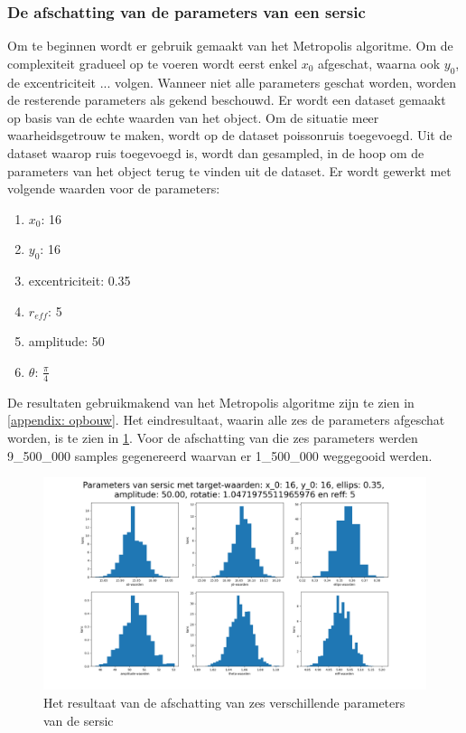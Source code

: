 \subsubsection{De afschatting van de parameters van een sersic}
Om te beginnen wordt er gebruik gemaakt van het Metropolis algoritme. Om de complexiteit gradueel op te voeren wordt eerst enkel $x_{0}$ afgeschat, waarna ook $y_{0}$, de excentriciteit ... volgen. Wanneer niet alle parameters geschat worden, worden de resterende parameters als gekend beschouwd. Er wordt een dataset gemaakt op basis van de echte waarden van het object. Om de situatie meer waarheidsgetrouw te maken, wordt op de dataset poissonruis toegevoegd. Uit de dataset waarop ruis toegevoegd is, wordt dan gesampled, in de hoop om de parameters van het object terug te vinden uit de dataset.
Er wordt gewerkt met volgende waarden voor de parameters:
\begin{enumerate}
    \item $x_{0}$: 16
    \item $y_{0}$: 16
    \item excentriciteit: 0.35 
    \item $r_{eff}$: 5
    \item amplitude: 50
    \item $\theta$: $\frac{\pi}{4}$
\end{enumerate}
De resultaten gebruikmakend van het Metropolis algoritme zijn te zien in \cref{appendix: opbouw}. Het eindresultaat, waarin alle zes de parameters afgeschat worden, is te zien in \cref{fig: 6 onbekenden}. Voor de afschatting van die zes parameters werden 9\_500\_000 samples gegenereerd waarvan er 1\_500\_000 weggegooid werden.
\begin{figure}
    \centering
    \includegraphics[width=0.95\linewidth]{Figures/sersic_parameters_metropolis_8500000_1500000_50_reff.png}
    \caption{Het resultaat van de afschatting van zes verschillende parameters van de sersic}
    \label{fig: 6 onbekenden}
\end{figure}
